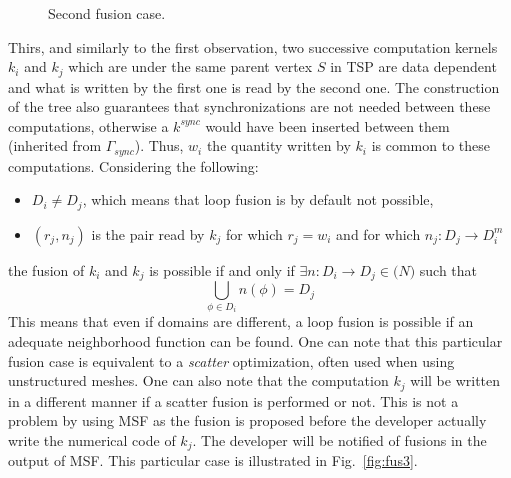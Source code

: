 \begin{figure}[h!]
\begin{center}
\caption{Second fusion case.}
\label{fig:fus2}
\end{center}
\end{figure}

Thirs, and similarly to the first observation, two successive computation kernels $k_i$ and $k_j$ which are under the same parent vertex $S$ in TSP are data dependent and what is written by the first one is read by the second one. The construction of the tree also guarantees that synchronizations are not needed between these computations, otherwise a $k^{sync}$ would have been inserted between them (inherited from $\Gamma_{sync}$). Thus, $w_i$ the quantity written by $k_i$ is common to these computations. Considering the following:
\begin{itemize}
\item $D_i \neq D_j$, which means that loop fusion is by default not possible,
\item $(r_j,n_j)$ is the pair read by $k_j$ for which $r_j=w_i$ and for which $n_j:D_j \rightarrow D_i^m$
\end{itemize}
the fusion of $k_i$ and $k_j$ is possible if and only if $\exists n:D_i \rightarrow D_j \in \mathcal(N)$ such that
\begin{equation*}
\bigcup_{\phi \in D_i} n(\phi) = D_j
\end{equation*}
This means that even if domains are different, a loop fusion is possible if an adequate neighborhood function can be found. One can note that this particular fusion case is equivalent to a \emph{scatter} optimization, often used when using unstructured meshes. One can also note that the computation $k_j$ will be written in a different manner if a scatter fusion is performed or not. This is not a problem by using MSF as the fusion is proposed before the developer actually write the numerical code of $k_j$. The developer will be notified of fusions in the output of MSF. This particular case is illustrated in Fig.~\ref{fig:fus3}.

